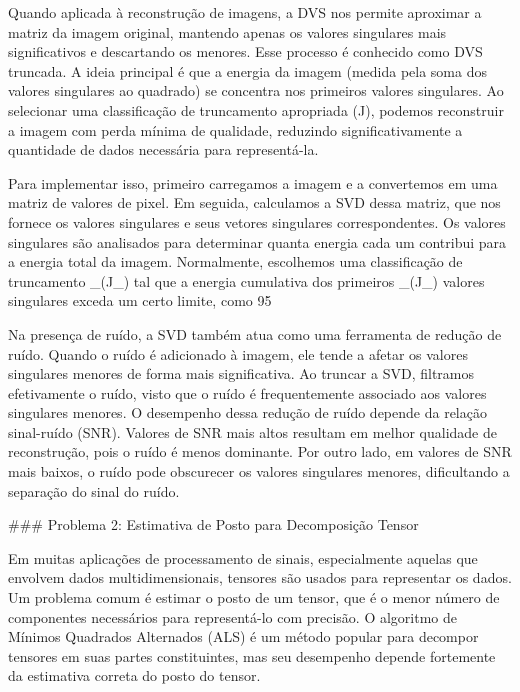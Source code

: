 Quando aplicada à reconstrução de imagens, a DVS nos permite aproximar a matriz da imagem original, mantendo apenas os valores singulares mais significativos e descartando os menores. Esse processo é conhecido como DVS truncada. A ideia principal é que a energia da imagem (medida pela soma dos valores singulares ao quadrado) se concentra nos primeiros valores singulares. Ao selecionar uma classificação de truncamento apropriada (J), podemos reconstruir a imagem com perda mínima de qualidade, reduzindo significativamente a quantidade de dados necessária para representá-la.

Para implementar isso, primeiro carregamos a imagem e a convertemos em uma matriz de valores de pixel. Em seguida, calculamos a SVD dessa matriz, que nos fornece os valores singulares e seus vetores singulares correspondentes. Os valores singulares são analisados para determinar quanta energia cada um contribui para a energia total da imagem. Normalmente, escolhemos uma classificação de truncamento _(J_) tal que a energia cumulativa dos primeiros _(J_) valores singulares exceda um certo limite, como 95%

Na presença de ruído, a SVD também atua como uma ferramenta de redução de ruído. Quando o ruído é adicionado à imagem, ele tende a afetar os valores singulares menores de forma mais significativa. Ao truncar a SVD, filtramos efetivamente o ruído, visto que o ruído é frequentemente associado aos valores singulares menores. O desempenho dessa redução de ruído depende da relação sinal-ruído (SNR). Valores de SNR mais altos resultam em melhor qualidade de reconstrução, pois o ruído é menos dominante. Por outro lado, em valores de SNR mais baixos, o ruído pode obscurecer os valores singulares menores, dificultando a separação do sinal do ruído.

### Problema 2: Estimativa de Posto para Decomposição Tensor

Em muitas aplicações de processamento de sinais, especialmente aquelas que envolvem dados multidimensionais, tensores são usados para representar os dados. Um problema comum é estimar o posto de um tensor, que é o menor número de componentes necessários para representá-lo com precisão. O algoritmo de Mínimos Quadrados Alternados (ALS) é um método popular para decompor tensores em suas partes constituintes, mas seu desempenho depende fortemente da estimativa correta do posto do tensor.


